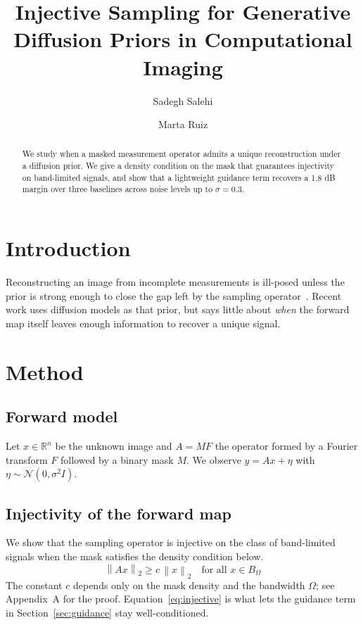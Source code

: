 \documentclass[journal]{IEEEtran}
\title{Injective Sampling for Generative Diffusion Priors in Computational Imaging}
\author{Sadegh Salehi \and Marta Ruiz}
\newcommand{\norm}[1]{\left\lVert #1 \right\rVert}
\begin{document}
\maketitle

\begin{abstract}
We study when a masked measurement operator admits a unique reconstruction under a diffusion prior. We give a density condition on the mask that guarantees injectivity on band-limited signals, and show that a lightweight guidance term recovers a 1.8 dB margin over three baselines across noise levels up to $\sigma = 0.3$.
\end{abstract}

\section{Introduction}
Reconstructing an image from incomplete measurements is ill-posed unless the prior is strong enough to close the gap left by the sampling operator~\cite{candes2006,ho2020ddpm}. Recent work uses diffusion models as that prior, but says little about \emph{when} the forward map itself leaves enough information to recover a unique signal.

\section{Method}
\subsection{Forward model}
Let $x \in \mathbb{R}^n$ be the unknown image and $A = M F$ the operator formed by a Fourier transform $F$ followed by a binary mask $M$. We observe $y = A x + \eta$ with $\eta \sim \mathcal{N}(0, \sigma^2 I)$.

\subsection{Injectivity of the forward map}
We show that the sampling operator is injective on the class of band-limited signals when the mask satisfies the density condition below.
\begin{equation}
  \norm{A x}_2 \ge c \, \norm{x}_2 \quad \text{for all } x \in B_\Omega
  \label{eq:injective}
\end{equation}
The constant $c$ depends only on the mask density and the bandwidth $\Omega$; see Appendix~A for the proof. Equation~\eqref{eq:injective} is what lets the guidance term in Section~\ref{sec:guidance} stay well-conditioned.
\end{document}
